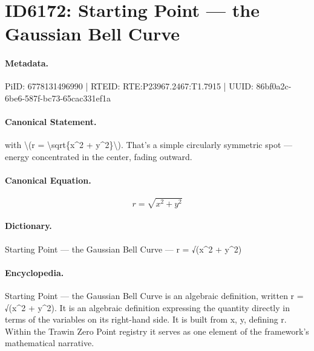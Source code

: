 \section*{ID6172: Starting Point — the Gaussian Bell Curve}
\paragraph{Metadata.}
PiID: 6778131496990 | RTEID: RTE:P23967.2467:T1.7915 | UUID: 86bf0a2c-6be6-587f-bc73-65cac331ef1a

\paragraph{Canonical Statement.}
with \textbackslash{}(r = \textbackslash{}sqrt\{x\textasciicircum{}2 + y\textasciicircum{}2\}\textbackslash{}). That’s a simple circularly symmetric spot — energy concentrated in the center, fading outward.

\paragraph{Canonical Equation.}
\[
r = \sqrt{x^2 + y^2}
\]

\paragraph{Dictionary.}
Starting Point — the Gaussian Bell Curve — r = √(x\textasciicircum{}2 + y\textasciicircum{}2)

\paragraph{Encyclopedia.}
Starting Point — the Gaussian Bell Curve is an algebraic definition, written r = √(x\textasciicircum{}2 + y\textasciicircum{}2). It is an algebraic definition expressing the quantity directly in terms of the variables on its right-hand side. It is built from x, y, defining r. Within the Trawin Zero Point registry it serves as one element of the framework's mathematical narrative.
